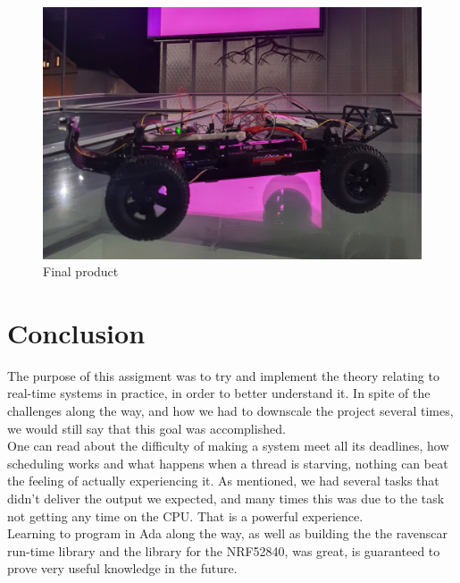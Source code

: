 \documentclass{article}
\begin{document}
\begin{figure}[H]
	\centering
	\includegraphics[width=\linewidth]{showcase.png}
	\caption{Final product}
	\label{showcase}
\end{figure}

\section{Conclusion}

The purpose of this assigment was to try and implement the theory relating to real-time systems in practice, in order to better understand it. In spite of the challenges along the way, and how we had to downscale the project several times, we would still say that this goal was accomplished.\\

One can read about the difficulty of making a system meet all its deadlines, how scheduling works and what happens when a thread is starving, nothing can beat the feeling of actually experiencing it. As mentioned, we had several tasks that didn't deliver the output we expected, and many times this was due to the task not getting any time on the CPU. That is a powerful experience.\\

Learning to program in Ada along the way, as well as building the the ravenscar run-time library and the library for the NRF52840, was great, is guaranteed to prove very useful knowledge in the future.\\

\newpage
\nocite{*}



\newpage
\end{document}
